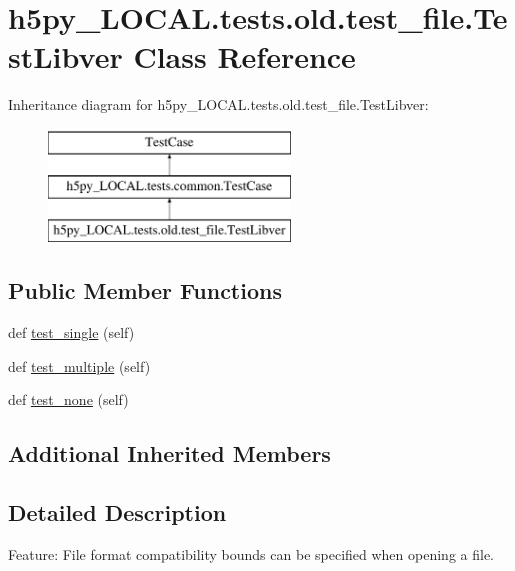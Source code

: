 \hypertarget{classh5py__LOCAL_1_1tests_1_1old_1_1test__file_1_1TestLibver}{}\section{h5py\+\_\+\+L\+O\+C\+A\+L.\+tests.\+old.\+test\+\_\+file.\+Test\+Libver Class Reference}
\label{classh5py__LOCAL_1_1tests_1_1old_1_1test__file_1_1TestLibver}
Inheritance diagram for h5py\+\_\+\+L\+O\+C\+A\+L.\+tests.\+old.\+test\+\_\+file.\+Test\+Libver\+:\begin{figure}[H]
\begin{center}
\leavevmode
\includegraphics[height=3.000000cm]{classh5py__LOCAL_1_1tests_1_1old_1_1test__file_1_1TestLibver}
\end{center}
\end{figure}
\subsection*{Public Member Functions}
\begin{DoxyCompactItemize}
\item 
def \hyperlink{classh5py__LOCAL_1_1tests_1_1old_1_1test__file_1_1TestLibver_abc81c59b2f952d18a69e12c912aac474}{test\+\_\+single} (self)
\item 
def \hyperlink{classh5py__LOCAL_1_1tests_1_1old_1_1test__file_1_1TestLibver_a3d8ee14b9a2aca51e632f14eef1b2bc2}{test\+\_\+multiple} (self)
\item 
def \hyperlink{classh5py__LOCAL_1_1tests_1_1old_1_1test__file_1_1TestLibver_ad277e8882be1ba3d838eb3e25a969407}{test\+\_\+none} (self)
\end{DoxyCompactItemize}
\subsection*{Additional Inherited Members}


\subsection{Detailed Description}
\begin{DoxyVerb}    Feature: File format compatibility bounds can be specified when
    opening a file.
\end{DoxyVerb}
 

